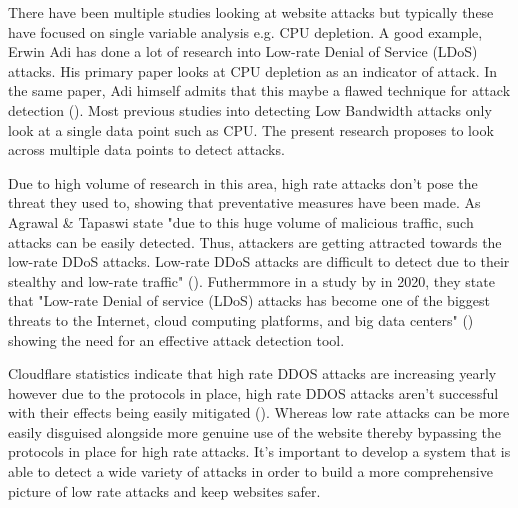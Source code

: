 
There have been multiple studies looking at website attacks but typically these have focused on single variable analysis e.g. CPU depletion. A good example, Erwin Adi has done a lot of research into Low-rate Denial of Service (LDoS) attacks. His primary paper looks at CPU depletion as an indicator of attack. In the same paper, Adi himself admits that this maybe a flawed technique for attack detection (\cite{Adi2016}). Most previous studies into detecting Low Bandwidth attacks only look at a single data point such as CPU. The present research proposes to look across multiple data points to detect attacks. 

Due to high volume of research in this area, high rate attacks don't pose the threat they used to, showing that preventative measures have been made. As Agrawal \& Tapaswi state "due to this huge volume of malicious traffic, such attacks can be easily detected. Thus, attackers are getting attracted towards the low-rate DDoS attacks. Low-rate DDoS attacks are difficult to detect due to their stealthy and low-rate traffic" (\cite{8794618}). Futhermmore in a study by \citeauthor{9016229} in 2020, they state that "Low-rate Denial of service (LDoS) attacks has become one of the biggest threats to the Internet, cloud computing platforms, and big data centers" (\cite{9016229}) showing the need for an effective attack detection tool.

Cloudflare statistics indicate that high rate DDOS attacks are increasing yearly however due to the protocols in place, high rate DDOS attacks aren't successful with their effects being easily mitigated (\cite{Q3attacks}). Whereas low rate attacks can be more easily disguised alongside more genuine use of the website thereby bypassing the protocols in place for high rate attacks. It's important to develop a system that is able to detect a wide variety of attacks in order to build a more comprehensive picture of low rate attacks and keep websites safer.

